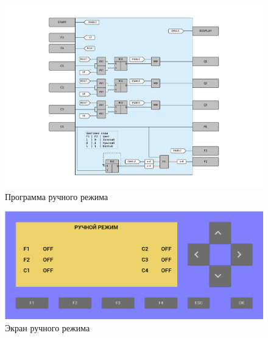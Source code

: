 \begin{figure}[pt]
    \centering
    \includegraphics[width=1\textwidth]{fig/manual.pdf}
    \caption{Программа ручного режима}
    \label{fig:manual_mode}
\end{figure}

\begin{figure}[pb]
    \centering
    \includegraphics[width=1\textwidth]{fig/manual_panel.png}
    \caption{Экран ручного режима}
    \label{fig:manual_screen}
\end{figure}





%
%
%
